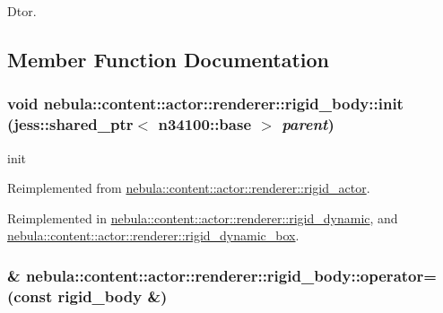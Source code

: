 Dtor. 

\subsection{Member Function Documentation}
\hypertarget{classnebula_1_1content_1_1actor_1_1renderer_1_1rigid__body_afd1175cdc7b35a918db4bd89c59463f0}{
\subsubsection[{init}]{\setlength{\rightskip}{0pt plus 5cm}void nebula::content::actor::renderer::rigid\_\-body::init (jess::shared\_\-ptr$<$ {\bf n34100::base} $>$ {\em parent})}}
\label{classnebula_1_1content_1_1actor_1_1renderer_1_1rigid__body_afd1175cdc7b35a918db4bd89c59463f0}


init 

Reimplemented from \hyperlink{classnebula_1_1content_1_1actor_1_1renderer_1_1rigid__actor_aefd8a0b2b060c60669607f3cc060b607}{nebula::content::actor::renderer::rigid\_\-actor}.

Reimplemented in \hyperlink{classnebula_1_1content_1_1actor_1_1renderer_1_1rigid__dynamic_ab957f8a465493d2a9d7a2f0015d4a5ea}{nebula::content::actor::renderer::rigid\_\-dynamic}, and \hyperlink{classnebula_1_1content_1_1actor_1_1renderer_1_1rigid__dynamic__box_a73d0f162b01df6a9f025d51477d37789}{nebula::content::actor::renderer::rigid\_\-dynamic\_\-box}.\hypertarget{classnebula_1_1content_1_1actor_1_1renderer_1_1rigid__body_a448e47741d24ba24fbedbd7438159a12}{
\subsubsection[{operator=}]{\& nebula::content::actor::renderer::rigid\_\-body::operator= (const {\bf rigid\_\-body} \&)}}
\label{classnebula_1_1content_1_1actor_1_1renderer_1_1rigid__body_a448e47741d24ba24fbedbd7438159a12}


